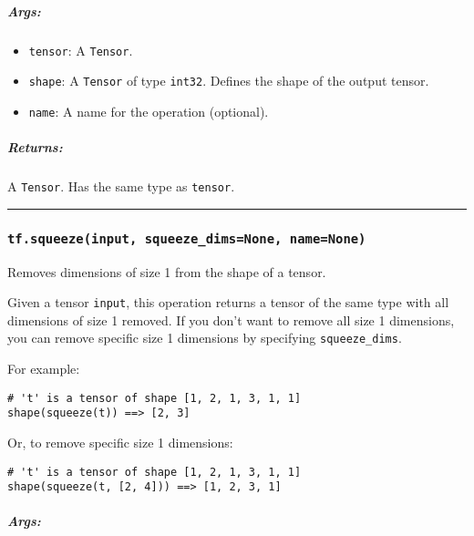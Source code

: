 \subparagraph{Args: }\label{args-10}

\begin{itemize}
\tightlist
\item
  \lstinline{tensor}: A \lstinline{Tensor}.
\item
  \lstinline{shape}: A \lstinline{Tensor} of type \lstinline{int32}. Defines the
  shape of the output tensor.
\item
  \lstinline{name}: A name for the operation (optional).
\end{itemize}

\subparagraph{Returns: }\label{returns-10}

A \lstinline{Tensor}. Has the same type as \lstinline{tensor}.

\begin{center}\rule{0.5\linewidth}{\linethickness}\end{center}

\subsubsection{\texorpdfstring{\lstinline{tf.squeeze(input, squeeze_dims=None, name=None)}
}{tf.squeeze(input, squeeze_dims=None, name=None) }}\label{tf.squeezeinput-squeezeux5fdimsnone-namenone}

Removes dimensions of size 1 from the shape of a tensor.

Given a tensor \lstinline{input}, this operation returns a tensor of the
same type with all dimensions of size 1 removed. If you don't want to
remove all size 1 dimensions, you can remove specific size 1 dimensions
by specifying \lstinline{squeeze_dims}.

For example:

\begin{lstlisting}
# 't' is a tensor of shape [1, 2, 1, 3, 1, 1]
shape(squeeze(t)) ==> [2, 3]
\end{lstlisting}

Or, to remove specific size 1 dimensions:

\begin{lstlisting}
# 't' is a tensor of shape [1, 2, 1, 3, 1, 1]
shape(squeeze(t, [2, 4])) ==> [1, 2, 3, 1]
\end{lstlisting}

\subparagraph{Args: }\label{args-11}


